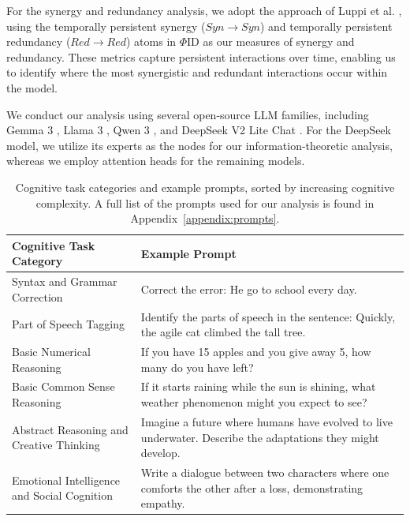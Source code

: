 \documentclass[11pt,a4paper]{ouparticle}
\begin{document}
For the synergy and redundancy analysis, we adopt the approach of Luppi et al. \cite{luppi2022synergistic}, using the temporally persistent synergy ($Syn\rightarrow Syn$) and temporally persistent redundancy ($Red\rightarrow Red$) atoms in $\Phi$ID as our measures of synergy and redundancy. These metrics capture persistent interactions over time, enabling us to identify where the most synergistic and redundant interactions occur within the model.

We conduct our analysis using several open-source LLM families, including Gemma 3 \cite{google2024gemma}, Llama 3 \cite{dubey2024llama}, Qwen 3 \cite{yang2025qwen3}, and DeepSeek V2 Lite Chat \cite{liu2024deepseek}. For the DeepSeek model, we utilize its experts as the nodes for our information-theoretic analysis, whereas we employ attention heads for the remaining models.


\begin{table}
    \centering
    \begin{tabular}{>{\centering\arraybackslash}p{5cm} >{\centering\arraybackslash}p{10cm}}
        \toprule
        \textbf{Cognitive Task Category} & \textbf{Example Prompt} \\
        \midrule
        Syntax and Grammar Correction & Correct the error: He go to school every day. \\
        \addlinespace
        Part of Speech Tagging & Identify the parts of speech in the sentence: Quickly, the agile cat climbed the tall tree. \\
        \addlinespace
        Basic Numerical Reasoning & If you have 15 apples and you give away 5, how many do you have left? \\
        \addlinespace
        Basic Common Sense Reasoning & If it starts raining while the sun is shining, what weather phenomenon might you expect to see? \\
        \addlinespace
        Abstract Reasoning and Creative Thinking & Imagine a future where humans have evolved to live underwater. Describe the adaptations they might develop. \\
        \addlinespace
        Emotional Intelligence and Social Cognition & Write a dialogue between two characters where one comforts the other after a loss, demonstrating empathy. \\
        \bottomrule
    \end{tabular}
    \caption{Cognitive task categories and example prompts, sorted by increasing cognitive complexity. A full list of the prompts used for our analysis is found in Appendix~\ref{appendix:prompts}.}
    \label{tab:cognitive_task_examples}
\end{table}
\end{document}
